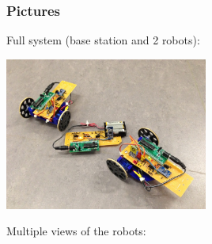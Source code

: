 \documentclass[]{article}
\begin{document}
\hypertarget{pictures}{%
\subsubsection{Pictures}\label{pictures}}

Full system (base station and 2 robots):

\includegraphics[width=0.5\textwidth,height=\textheight]{full_system.jpg}

Multiple views of the robots:
\end{document}
